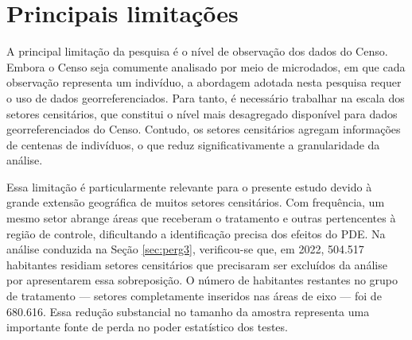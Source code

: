 \section{Principais limitações}




A principal limitação da pesquisa é o nível de observação dos dados do Censo. Embora o Censo seja comumente analisado por meio de microdados, em que cada observação representa um indivíduo, a abordagem adotada nesta pesquisa requer o uso de dados georreferenciados. Para tanto, é necessário trabalhar na escala dos setores censitários, que constitui o nível mais desagregado disponível para dados georreferenciados do Censo. Contudo, os setores censitários agregam informações de centenas de indivíduos, o que reduz significativamente a granularidade da análise.

Essa limitação é particularmente relevante para o presente estudo devido à grande extensão geográfica de muitos setores censitários. Com frequência, um mesmo setor abrange áreas que receberam o tratamento e outras pertencentes à região de controle, dificultando a identificação precisa dos efeitos do PDE. Na análise conduzida na Seção \ref{sec:perg3}, verificou-se que, em 2022, 504.517 habitantes residiam setores censitários que precisaram ser excluídos da análise por apresentarem essa sobreposição. O número de habitantes restantes no grupo de tratamento — setores completamente inseridos nas áreas de eixo — foi de 680.616. Essa redução substancial no tamanho da amostra representa uma importante fonte de perda no poder estatístico dos testes.

